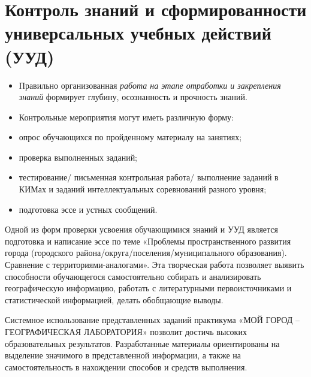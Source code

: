 \documentclass[
  11pt,
  russian,
]{book}
\begin{document}
\hypertarget{ux43aux43eux43dux442ux440ux43eux43bux44c-ux437ux43dux430ux43dux438ux439-ux438-ux441ux444ux43eux440ux43cux438ux440ux43eux432ux430ux43dux43dux43eux441ux442ux438-ux443ux43dux438ux432ux435ux440ux441ux430ux43bux44cux43dux44bux445-ux443ux447ux435ux431ux43dux44bux445-ux434ux435ux439ux441ux442ux432ux438ux439-ux443ux443ux434}{%
\section*{Контроль знаний и сформированности универсальных учебных действий (УУД)}\label{ux43aux43eux43dux442ux440ux43eux43bux44c-ux437ux43dux430ux43dux438ux439-ux438-ux441ux444ux43eux440ux43cux438ux440ux43eux432ux430ux43dux43dux43eux441ux442ux438-ux443ux43dux438ux432ux435ux440ux441ux430ux43bux44cux43dux44bux445-ux443ux447ux435ux431ux43dux44bux445-ux434ux435ux439ux441ux442ux432ux438ux439-ux443ux443ux434}}

\begin{itemize}
\item
  Правильно организованная \emph{работа на этапе отработки и закрепления знаний} формирует глубину, осознанность и прочность знаний.
\item
  Контрольные мероприятия могут иметь различную форму:
\item
  опрос обучающихся по пройденному материалу на занятиях;
\item
  проверка выполненных заданий;
\item
  тестирование/ письменная контрольная работа/ выполнение заданий в КИМах и заданий интеллектуальных соревнований разного уровня;
\item
  подготовка эссе и устных сообщений.
\end{itemize}

Одной из форм проверки усвоения обучающимися знаний и УУД является подготовка и написание эссе по теме «Проблемы пространственного развития города (городского района/округа/поселения/муниципального образования). Сравнение с территориями-аналогами». Эта творческая работа позволяет выявить способности обучающегося самостоятельно собирать и анализировать географическую информацию, работать с литературными первоисточниками и статистической информацией, делать обобщающие выводы.

Системное использование представленных заданий практикума «МОЙ ГОРОД -- ГЕОГРАФИЧЕСКАЯ ЛАБОРАТОРИЯ» позволит достичь высоких образовательных результатов. Разработанные материалы ориентированы на выделение значимого в представленной информации, а также на самостоятельность в нахождении способов и средств выполнения.
\end{document}
